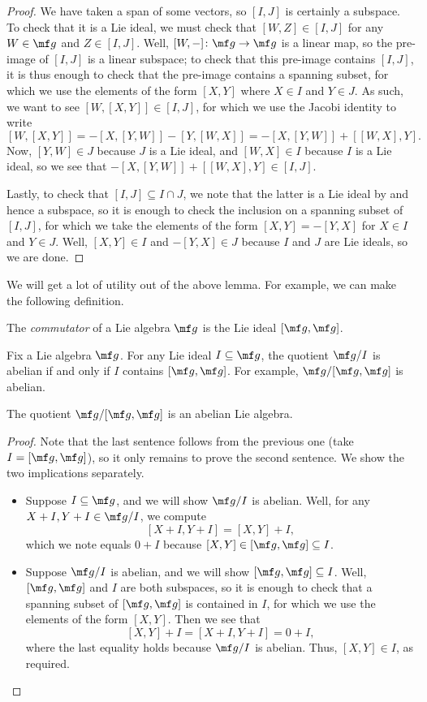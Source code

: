 \documentclass[../notes.tex]{subfiles}
\begin{document}
\begin{proof}
	We have taken a span of some vectors, so $[I,J]$ is certainly a subspace. To check that it is a Lie ideal, we must check that $[W,Z]\in[I,J]$ for any $W\in\mf g$ and $Z\in[I,J]$. Well, $[W,-]\colon\mf g\to\mf g$ is a linear map, so the pre-image of $[I,J]$ is a linear subspace; to check that this pre-image contains $[I,J]$, it is thus enough to check that the pre-image contains a spanning subset, for which we use the elements of the form $[X,Y]$ where $X\in I$ and $Y\in J$. As such, we want to see $[W,[X,Y]]\in[I,J]$, for which we use the Jacobi identity to write
	\[[W,[X,Y]]=-[X,[Y,W]]-[Y,[W,X]]=-[X,[Y,W]]+[[W,X],Y].\]
	Now, $[Y,W]\in J$ because $J$ is a Lie ideal, and $[W,X]\in I$ because $I$ is a Lie ideal, so we see that $-[X,[Y,W]]+[[W,X],Y]\in[I,J]$.

	Lastly, to check that $[I,J]\subseteq I\cap J$, we note that the latter is a Lie ideal by  and hence a subspace, so it is enough to check the inclusion on a spanning subset of $[I,J]$, for which we take the elements of the form $[X,Y]=-[Y,X]$ for $X\in I$ and $Y\in J$. Well, $[X,Y]\in I$ and $-[Y,X]\in J$ because $I$ and $J$ are Lie ideals, so we are done.
\end{proof}
We will get a lot of utility out of the above lemma. For example, we can make the following definition.
\begin{definition}[commutator]
	The \textit{commutator} of a Lie algebra $\mf g$ is the Lie ideal $[\mf g,\mf g]$.
\end{definition}
\begin{lemma}
	Fix a Lie algebra $\mf g$. For any Lie ideal $I\subseteq\mf g$, the quotient $\mf g/I$ is abelian if and only if $I$ contains $[\mf g,\mf g]$. For example, $\mf g/[\mf g,\mf g]$ is abelian.
	\begin{listalph}
		\item The quotient $\mf g/[\mf g,\mf g]$ is an abelian Lie algebra.
		\item 
	\end{listalph}
\end{lemma}
\begin{proof}
	Note that the last sentence follows from the previous one (take $I=[\mf g,\mf g]$), so it only remains to prove the second sentence. We show the two implications separately.
	\begin{itemize}
		\item Suppose $I\subseteq\mf g$, and we will show $\mf g/I$ is abelian. Well, for any $X+I,Y+I\in\mf g/I$, we compute
		\[[X+I,Y+I] = [X,Y]+I,\]
		which we note equals $0+I$ because $[X,Y]\in[\mf g,\mf g]\subseteq I$.
		\item Suppose $\mf g/I$ is abelian, and we will show $[\mf g,\mf g]\subseteq I$. Well, $[\mf g,\mf g]$ and $I$ are both subspaces, so it is enough to check that a spanning subset of $[\mf g,\mf g]$ is contained in $I$, for which we use the elements of the form $[X,Y]$. Then we see that
		\[[X,Y]+I=[X+I,Y+I]=0+I,\]
		where the last equality holds because $\mf g/I$ is abelian. Thus, $[X,Y]\in I$, as required.
		\qedhere
	\end{itemize}
\end{proof}
\end{document}
